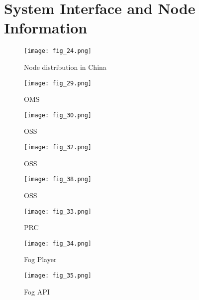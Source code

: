 \chapter{System Interface and Node Information}
\label{chap:appE}

\begin{figure}[htbp]
\centering
	  \texttt{[image: fig\_24.png]}
    \caption{Node distribution in China}
 \label{fig_24}
\end{figure}

\begin{figure}[htbp]
\centering
	  \texttt{[image: fig\_29.png]}
    \caption{OMS}
 \label{fig_29}
\end{figure}

\begin{figure}[htbp]
\centering
	  \texttt{[image: fig\_30.png]}
    \caption{OSS}
 \label{fig_30}
\end{figure}


\begin{figure}[htbp]
\centering
	  \texttt{[image: fig\_32.png]}
    \caption{OSS}
 \label{fig_32}
\end{figure}

\begin{figure}[htbp]
\centering
	  \texttt{[image: fig\_38.png]}
    \caption{OSS}
 \label{fig_38}
\end{figure}



\begin{figure}[htbp]
\centering
	  \texttt{[image: fig\_33.png]}
    \caption{PRC}
 \label{fig_33}
\end{figure}

\begin{figure}[htbp]
\centering
	  \texttt{[image: fig\_34.png]}
    \caption{Fog Player}
 \label{fig_34}
\end{figure}

\begin{figure}[htbp]
\centering
	  \texttt{[image: fig\_35.png]}
    \caption{Fog API}
 \label{fig_35}
\end{figure}
